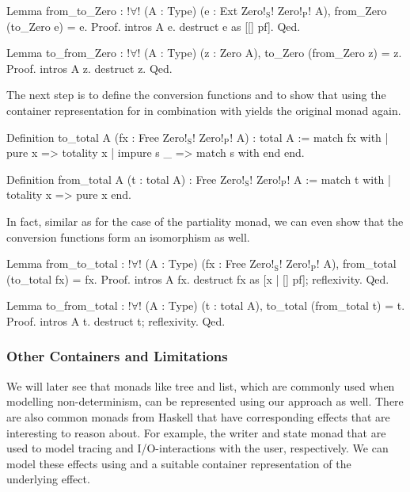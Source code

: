 \begin{coqcode}
Lemma from_to_Zero : !$\forall$! (A : Type) (e : Ext Zero!$_\text{S}$! Zero!$_\text{P}$! A),
    from_Zero (to_Zero e) = e.
Proof.
  intros A e. destruct e as [[] pf].
Qed.

Lemma to_from_Zero : !$\forall$! (A : Type) (z : Zero A),
    to_Zero (from_Zero z) = z.
Proof.
  intros A z. destruct z.
Qed.
\end{coqcode}

The next step is to define the conversion functions  and  to show that using the container representation for  in combination with  yields the original monad  again.

\begin{coqcode}
Definition to_total A (fx : Free Zero!$_\text{S}$! Zero!$_\text{P}$! A) : total A :=
  match fx with
  | pure x        => totality x
  | impure s _ => match s with end
  end.

Definition from_total A (t : total A) : Free Zero!$_\text{S}$! Zero!$_\text{P}$! A :=
  match t with
  | totality x => pure x
  end.
\end{coqcode}

\noindent
In fact, similar as for the case of the partiality monad, we can even show that the conversion functions form an isomorphism as well.

\begin{coqcode}
Lemma from_to_total : !$\forall$! (A : Type) (fx : Free Zero!$_\text{S}$! Zero!$_\text{P}$! A),
    from_total (to_total fx) = fx.
Proof.
  intros A fx. destruct fx as [x | [] pf]; reflexivity.
Qed.

Lemma to_from_total : !$\forall$! (A : Type) (t : total A),
    to_total (from_total t) = t.
Proof.
  intros A t. destruct t; reflexivity.
Qed.
\end{coqcode}

\subsubsection{Other Containers and Limitations}

We will later see that monads like tree and list, which are commonly used when modelling non\--determinism, can be represented using our approach as well.
There are also common monads from Haskell that have corresponding effects that are interesting to reason about.
For example, the writer and state monad that are used to model tracing and I/O\--interactions with the user, respectively.
We can model these effects using  and a suitable container representation of the underlying effect.

